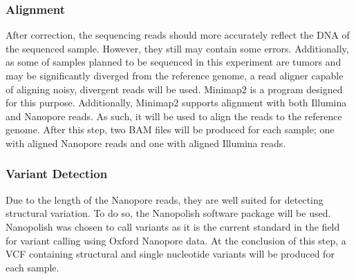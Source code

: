 \subsubsection{Alignment}

After correction, the sequencing reads should more accurately reflect the DNA of the sequenced sample. However, they still may contain some errors. Additionally, as some of samples planned to be sequenced in this experiment are tumors and may be significantly diverged from the reference genome, a read aligner capable of aligning noisy, divergent reads will be used.
Minimap2 \parencite{li_minimap2:_2017} is a program designed for this purpose. Additionally, Minimap2 supports alignment with both Illumina and Nanopore reads. As such, it will be used to align the reads to the reference genome.
After this step, two BAM files will be produced for each sample; one with aligned Nanopore reads and one with aligned Illumina reads.

\subsubsection{Variant Detection}

Due to the length of the Nanopore reads, they are well suited for detecting structural variation. To do so, the Nanopolish \parencite{loman_complete_2015} software package will be used.
Nanopolish was chosen to call variants as it is the current standard in the field for variant calling using Oxford Nanopore data.
At the conclusion of this step, a VCF containing structural and single nucleotide variants will be produced for each sample.

